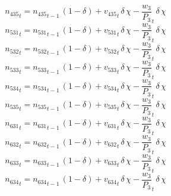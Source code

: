 \begin{dmath}
{{n_{435}}}_{t}={{n_{435}}}_{t-1}\, \left(1-{{\delta}}\right)+{{v_{435}}}_{t}\, {{\delta}}\, {{\chi}}-{{\frac{w_{3}}{P_{3}}}}_{t}\, {{\delta}}\, {{\chi}}
\end{dmath}
\begin{dmath}
{{n_{531}}}_{t}={{n_{531}}}_{t-1}\, \left(1-{{\delta}}\right)+{{v_{531}}}_{t}\, {{\delta}}\, {{\chi}}-{{\frac{w_{3}}{P_{3}}}}_{t}\, {{\delta}}\, {{\chi}}
\end{dmath}
\begin{dmath}
{{n_{532}}}_{t}={{n_{532}}}_{t-1}\, \left(1-{{\delta}}\right)+{{v_{532}}}_{t}\, {{\delta}}\, {{\chi}}-{{\frac{w_{3}}{P_{3}}}}_{t}\, {{\delta}}\, {{\chi}}
\end{dmath}
\begin{dmath}
{{n_{533}}}_{t}={{n_{533}}}_{t-1}\, \left(1-{{\delta}}\right)+{{v_{533}}}_{t}\, {{\delta}}\, {{\chi}}-{{\frac{w_{3}}{P_{3}}}}_{t}\, {{\delta}}\, {{\chi}}
\end{dmath}
\begin{dmath}
{{n_{534}}}_{t}={{n_{534}}}_{t-1}\, \left(1-{{\delta}}\right)+{{v_{534}}}_{t}\, {{\delta}}\, {{\chi}}-{{\frac{w_{3}}{P_{3}}}}_{t}\, {{\delta}}\, {{\chi}}
\end{dmath}
\begin{dmath}
{{n_{535}}}_{t}={{n_{535}}}_{t-1}\, \left(1-{{\delta}}\right)+{{v_{535}}}_{t}\, {{\delta}}\, {{\chi}}-{{\frac{w_{3}}{P_{3}}}}_{t}\, {{\delta}}\, {{\chi}}
\end{dmath}
\begin{dmath}
{{n_{631}}}_{t}={{n_{631}}}_{t-1}\, \left(1-{{\delta}}\right)+{{v_{631}}}_{t}\, {{\delta}}\, {{\chi}}-{{\frac{w_{3}}{P_{3}}}}_{t}\, {{\delta}}\, {{\chi}}
\end{dmath}
\begin{dmath}
{{n_{632}}}_{t}={{n_{632}}}_{t-1}\, \left(1-{{\delta}}\right)+{{v_{632}}}_{t}\, {{\delta}}\, {{\chi}}-{{\frac{w_{3}}{P_{3}}}}_{t}\, {{\delta}}\, {{\chi}}
\end{dmath}
\begin{dmath}
{{n_{633}}}_{t}={{n_{633}}}_{t-1}\, \left(1-{{\delta}}\right)+{{v_{633}}}_{t}\, {{\delta}}\, {{\chi}}-{{\frac{w_{3}}{P_{3}}}}_{t}\, {{\delta}}\, {{\chi}}
\end{dmath}
\begin{dmath}
{{n_{634}}}_{t}={{n_{634}}}_{t-1}\, \left(1-{{\delta}}\right)+{{v_{634}}}_{t}\, {{\delta}}\, {{\chi}}-{{\frac{w_{3}}{P_{3}}}}_{t}\, {{\delta}}\, {{\chi}}
\end{dmath}
